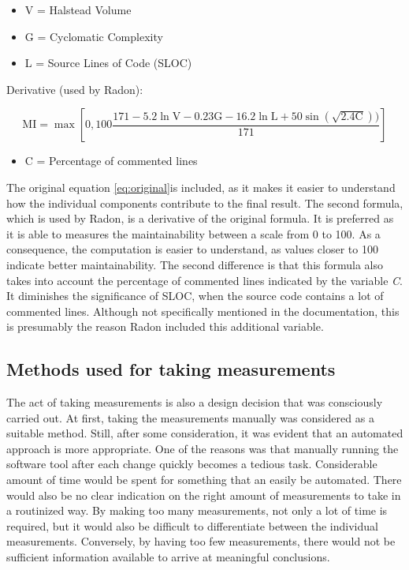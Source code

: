 \begin{itemize}
\item V = Halstead Volume
\item G = Cyclomatic Complexity
\item L = Source Lines of Code (SLOC)
\end{itemize}

Derivative (used by Radon):

\begin{equation}
\label{eq:radon}
\mathrm{MI}=\max \left[0,100 \frac{171-5.2 \ln \mathrm{V}-0.23 \mathrm{G}-16.2 \ln \mathrm{L}+50 \sin (\sqrt{2.4 \mathrm{C}}))}{171}\right]
\end{equation}

\begin{itemize}
\item C = Percentage of commented lines
\end{itemize}


The original equation \ref{eq:original}is included, as it makes it easier to understand how the individual components contribute to the final result. The second formula, which is used by Radon, is a derivative of the original formula. It is preferred as it is able to measures the maintainability between a scale from 0 to 100. As a consequence, the computation is easier to understand, as values closer to 100 indicate better maintainability. The second difference is that this formula also takes into account the percentage of commented lines indicated by the variable \emph{C}. It diminishes the significance of SLOC, when the source code contains a lot of commented lines. Although not specifically mentioned in the documentation, this is presumably the reason Radon included this additional variable. 

\subsection{Methods used for taking measurements}

The act of taking measurements is also a design decision that was consciously carried out. At first, taking the measurements manually was considered as a suitable method. Still, after some consideration, it was evident that an automated approach is more appropriate. One of the reasons was that manually running the software tool after each change quickly becomes a tedious task. Considerable amount of time would be spent for something that an easily be automated. There would also be no clear indication on the right amount of measurements to take in a routinized way. By making too many measurements, not only a lot of time is required, but it would also be difficult to differentiate between the individual measurements. Conversely, by having too few measurements, there would not be sufficient information available to arrive at meaningful conclusions.

